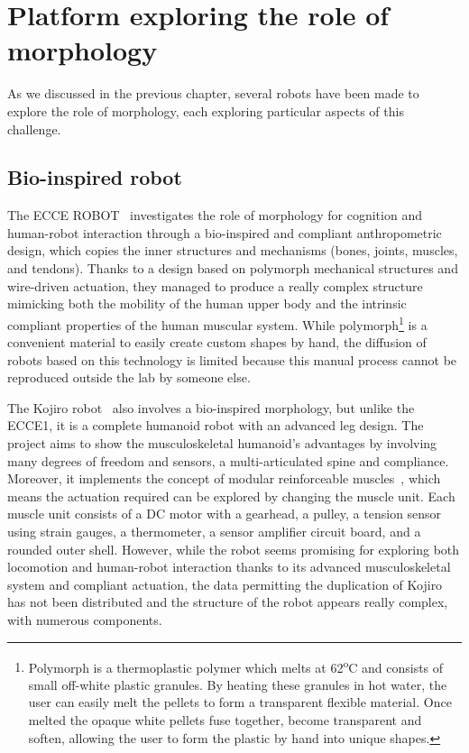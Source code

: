 \section{Platform exploring the role of morphology} %

As we discussed in the previous chapter, several robots have been made to explore the role of morphology, each exploring particular aspects of this challenge.

\subsection{Bio-inspired robot} %
\label{sub:compliant_robot}

The ECCE ROBOT~\parencite{marques2010ecce1} investigates the role of morphology for cognition and human-robot interaction through a bio-inspired and compliant anthropometric design, which copies the inner structures and mechanisms (bones, joints, muscles, and tendons). Thanks to a design based on polymorph mechanical structures and wire-driven actuation, they managed to produce a really complex structure mimicking both the mobility of the human upper body and the intrinsic compliant properties of the human muscular system.
While polymorph\footnote{Polymorph is a thermoplastic polymer which melts at 62\textsuperscript{o}C and consists of small off-white plastic granules. By heating these granules in hot water, the user can easily melt the pellets to form a transparent flexible material. Once melted the opaque white pellets fuse together, become transparent and soften, allowing the user to form the plastic by hand into unique shapes.} is a convenient material to easily create custom shapes by hand, the diffusion of robots based on this technology is limited because this manual process cannot be reproduced outside the lab by someone else.

The Kojiro robot~\parencite{mizuuchi2007advanced} also involves a bio-inspired morphology, but unlike the ECCE1, it is a complete humanoid robot with an advanced leg design. The project aims to show the musculoskeletal humanoid’s advantages by involving many degrees of freedom and sensors, a multi-articulated spine and compliance. Moreover,
it implements the concept of modular reinforceable muscles~\cite{mizuuchi2004design}, which means the actuation required can be explored by changing the muscle unit. Each muscle unit consists of a DC motor with a gearhead, a pulley, a tension sensor using strain gauges, a thermometer, a sensor amplifier circuit board, and a rounded outer shell.
However, while the robot seems promising for exploring both locomotion and human-robot interaction thanks to its advanced musculoskeletal system and compliant actuation, the data permitting the duplication of Kojiro has not been distributed and the structure of the robot appears really complex, with numerous components.

